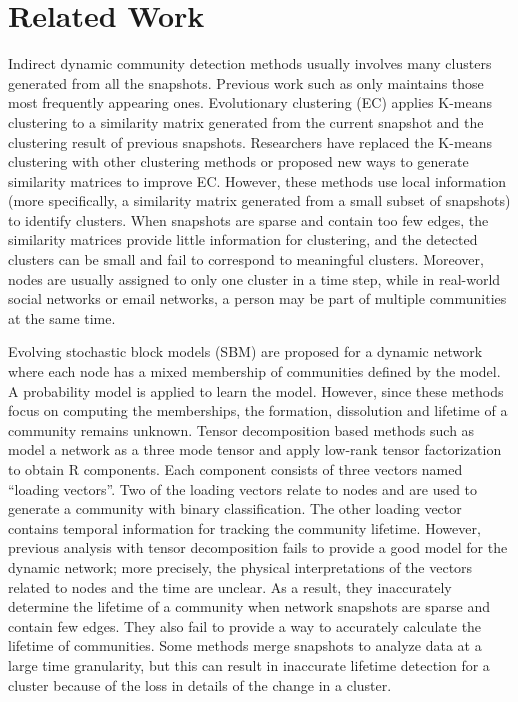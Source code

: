 \section{Related Work}
\label{sec:related}

Indirect dynamic community detection methods usually involves many clusters generated from all the snapshots. 
Previous work such as \cite{c7} only maintains those most frequently appearing ones.
Evolutionary clustering (EC) \cite{c6} applies K-means clustering to a similarity matrix generated from the current snapshot and the clustering result of previous snapshots. 
Researchers have replaced the K-means clustering with other clustering methods or proposed new ways to generate similarity matrices \cite{c26, c16, c3, c14, c28} to improve EC. 
However, these methods use local information (more specifically, a similarity matrix generated from a small subset of snapshots) to identify clusters. 
When snapshots are sparse and contain too few edges, the similarity matrices provide little information for clustering, and the detected clusters can be small and fail to correspond to meaningful clusters. Moreover, nodes are usually assigned to only one cluster in a time step, while in real-world social networks or email networks, a person may be part of multiple communities at the same time.

Evolving stochastic block models (SBM) \cite{c9, c30, c15} are proposed for a dynamic network where each node has a mixed membership of communities defined by the model. 
A probability model is applied to learn the model. 
However, since these methods focus on computing the memberships, the formation, dissolution and lifetime of a community remains unknown. Tensor decomposition based methods such as \cite{c10, c17} model a network as a three mode tensor and apply low-rank tensor factorization to obtain R components. 
Each component consists of three vectors named “loading vectors”. Two of the loading vectors relate to nodes and are used to generate a community with binary classification. 
The other loading vector contains temporal information for tracking the community lifetime. 
However, previous analysis with tensor decomposition fails to provide a good model for the dynamic network; more precisely, the physical interpretations of the vectors related to nodes and the time are unclear. As a result, they inaccurately determine the lifetime of a community when network snapshots are sparse and contain few edges. 
They also fail to provide a way to accurately calculate the lifetime of communities. 
Some methods merge snapshots to analyze data at a large time granularity, but this can result in inaccurate lifetime detection for a cluster because of the loss in details of the change in a cluster.